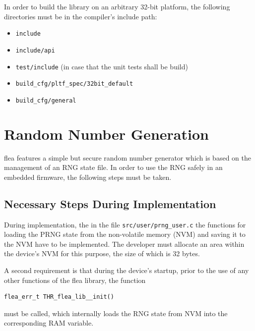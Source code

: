 \documentclass[a4paper,11pt]{scrartcl}
\begin{document}
  In order to build the library on an arbitrary 32-bit platform, the following
  directories must be in the compiler's include path:
  \begin{itemize}
    \item \verb#include#
    \item \verb#include/api#
    \item \verb#test/include# (in case that the unit tests shall be build)
    \item \verb#build_cfg/pltf_spec/32bit_default#
    \item \verb#build_cfg/general#
  \end{itemize}

\section{Random Number Generation }
\label{secRng}

flea features a simple but secure random number generator which is based on
the management of an RNG state file. In order to use the RNG safely in an
embedded firmware, the following steps must be taken. 

\subsection{Necessary Steps During Implementation}
During implementation, the in the file \verb#src/user/prng_user.c# the functions
for loading the PRNG state from the non-volatile memory (NVM)  and saving it to the NVM have to be
implemented. The developer must allocate an area within the device's NVM for
this purpose, the size of which is 32 bytes.

A second requirement is that during the device's startup, prior to the use of any
other functions of the flea library, the function 
\begin{verbatim}
flea_err_t THR_flea_lib__init()
\end{verbatim}
must be called, which internally loads the RNG state from NVM into the
corresponding RAM variable.
\end{document}
